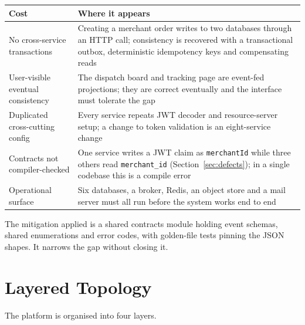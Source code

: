 \documentclass[11pt,a4paper,oneside,openany]{report}
\newcommand{\code}[1]{\texttt{\small #1}}
\begin{document}
\begin{center}
\small
\begin{tabular}{@{}p{4.6cm}p{9.6cm}@{}}
\toprule
\textbf{Cost} & \textbf{Where it appears} \\
\midrule
No cross-service transactions & Creating a merchant order writes to two databases through an HTTP
call; consistency is recovered with a transactional outbox, deterministic idempotency keys and
compensating reads \\
\addlinespace
User-visible eventual consistency & The dispatch board and tracking page are event-fed
projections; they are correct eventually and the interface must tolerate the gap \\
\addlinespace
Duplicated cross-cutting config & Every service repeats JWT decoder and resource-server setup; a
change to token validation is an eight-service change \\
\addlinespace
Contracts not compiler-checked & One service writes a JWT claim as \code{merchantId} while three
others read \code{merchant\_id} (Section~\ref{sec:defects}); in a single codebase this is a
compile error \\
\addlinespace
Operational surface & Six databases, a broker, Redis, an object store and a mail server must all
run before the system works end to end \\
\bottomrule
\end{tabular}
\label{tab:microcost}
\end{center}

The mitigation applied is a shared contracts module holding event schemas, shared enumerations and
error codes, with golden-file tests pinning the JSON shapes. It narrows the gap without closing it.

\section{Layered Topology}
The platform is organised into four layers.
\end{document}

